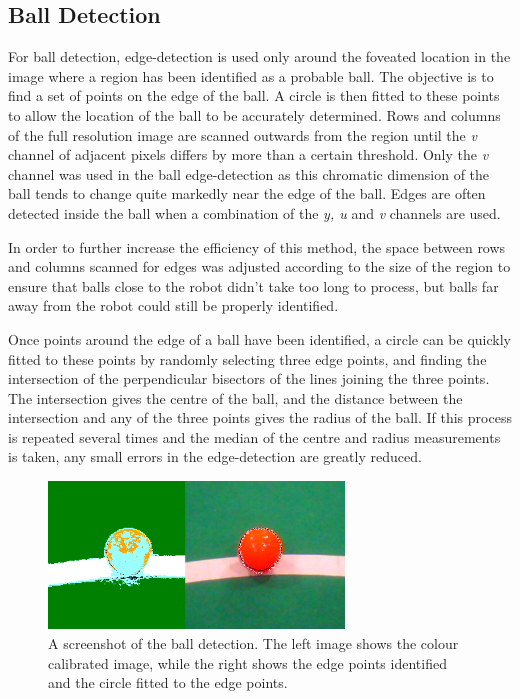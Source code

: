 \documentclass[runningheads,a4paper]{llncs}
\begin{document}
\subsection{Ball Detection}

For ball detection, edge-detection is used only around the foveated location in
the image where a region has been identified as a probable ball. The objective
is to find a set of points on the edge of the ball. A circle is then fitted to
these points to allow the location of the ball to be accurately determined. Rows
and columns of the full resolution image are scanned outwards from the region
until the \emph{v} channel of adjacent pixels differs by more than a certain
threshold. Only the \emph{v} channel was used in the ball edge-detection as this
chromatic dimension of the ball tends to change quite markedly near the edge of
the ball. Edges are often detected inside the ball when a combination of the
\emph{y, u} and \emph{v} channels are used. 

In order to further increase the efficiency of this method, the space between rows and columns scanned for edges was adjusted according to the size of the region to ensure that balls close to the robot didn't take too long to process, but balls far away from the robot could still be properly identified.

Once points around the edge of a ball have been identified, a circle can be
quickly fitted to these points by randomly selecting three edge points, and
finding the intersection of the perpendicular bisectors of the lines joining the
three points. The intersection gives the centre of the ball, and the distance
between the intersection and any of the three points gives the radius of the
ball. If this process is repeated several times and the median of the centre and
radius measurements is taken, any small errors in the edge-detection are greatly
reduced. 

\begin{figure} 
\centering
\includegraphics[width=0.7\textwidth]{figures/ballDetectionScreenshot.png}
\caption{A screenshot of the ball detection. The left image shows the colour calibrated image, while the right shows the edge points identified and the circle fitted to the edge points.} \label{fig:ballDetection}
\end{figure}
\end{document}
